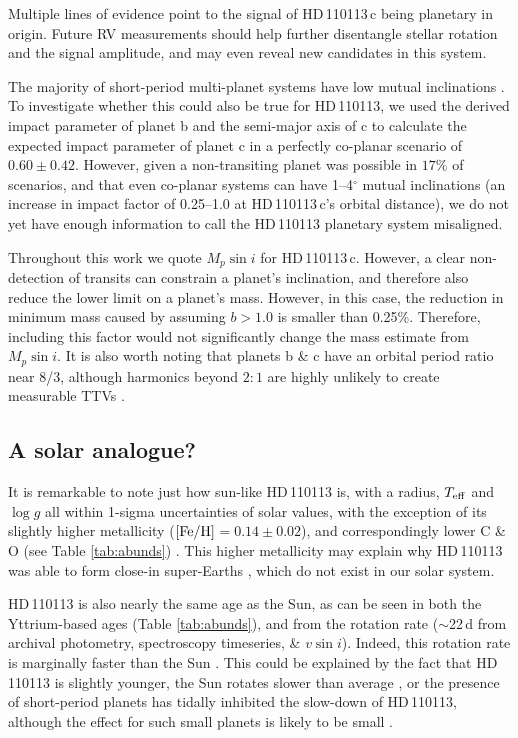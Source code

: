 \documentclass[fleqn,usenatbib]{mnras}
\newcommand{\vsini}{$v\sin{i}$}
\newcommand{\teff}{$T_{\rm eff}$}
\newcommand{\feh}{\mbox{$\rm [Fe/H]$}}
\newcommand{\logg}{$\log g$}
\newcommand{\Tstar}{HD\,110113}
\newcommand{\Tplanetc}{HD\,110113\,c}
\begin{document}
Multiple lines of evidence point to the signal of \Tplanetc{} being planetary in origin.
Future RV measurements should help further disentangle stellar rotation and the signal amplitude, and may even reveal new candidates in this system.

The majority of short-period multi-planet systems have low mutual inclinations \citep{lissauer2011architecture, 2012A&A...541A.139F}.
To investigate whether this could also be true for \Tstar{}, we used the derived impact parameter of planet b and the semi-major axis of c to calculate the expected impact parameter of planet c in a perfectly co-planar scenario of $0.60\pm0.42$. 
However, given a non-transiting planet was possible in $17\%$ of scenarios, and that even co-planar systems can have 1--4$^{\circ}$ mutual inclinations (an increase in impact factor of 0.25--1.0 at \Tplanetc{}'s orbital distance), we do not yet have enough information to call the \Tstar{} planetary system misaligned.

Throughout this work we quote $M_p\sin{i}$ for \Tplanetc{}. However, a clear non-detection of transits can constrain a planet's inclination, and therefore also reduce the lower limit on a planet's mass.
However, in this case, the reduction in minimum mass caused by assuming $b>1.0$ is smaller than 0.25\%. Therefore, including this factor would not significantly change the mass estimate from $M_p\sin{i}$.
It is also worth noting that planets b \& c have an orbital period ratio near 8/3, although harmonics beyond $2:1$ are highly unlikely to create measurable TTVs \citep{deck2015measurement}.

\subsection{A solar analogue?}
It is remarkable to note just how sun-like \Tstar{} is, with a radius, \teff{} and \logg{} all within 1-sigma uncertainties of solar values, with the exception of its slightly higher metallicity (\feh{}$ = 0.14\pm0.02$), and correspondingly lower C \& O (see Table \ref{tab:abunds}) \citep[e.g.][]{Franchini2020,2015A&A...576A..89B}.
This higher metallicity may explain why \Tstar{} was able to form close-in super-Earths \citep{mulders2016super,bitsch2020influence}, which do not exist in our solar system.

\Tstar{} is also nearly the same age as the Sun, as can be seen in both the Yttrium-based ages (Table \ref{tab:abunds}), and from the rotation rate ($\sim$22\,d from archival photometry, spectroscopy timeseries, \& \vsini{}).
Indeed, this rotation rate is marginally faster than the Sun \citep[25--26.5\,d when measured with HARPS-N and converted to sidereal period,][]{milbourne2019harps}.
This could be explained by the fact that \Tstar{} is slightly younger, the Sun rotates slower than average \citep{2008ApJ...684..691R}, or the presence of short-period planets has tidally inhibited the slow-down of \Tstar{}, although the effect for such small planets is likely to be small \citep{bolmont2012effect}.
\end{document}
